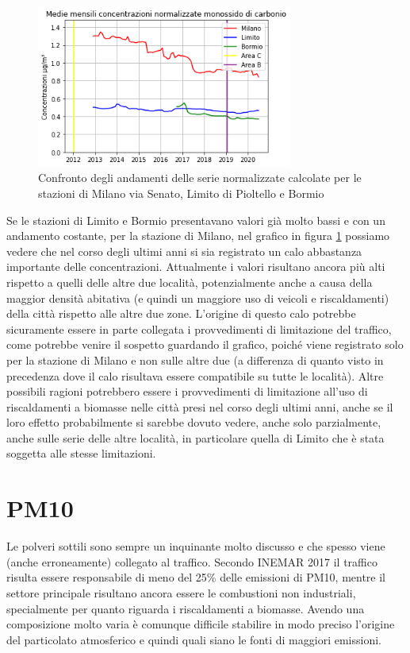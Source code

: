 \documentclass[a4paper]{report}
\begin{document}
\begin{figure}[h]
\centering
\includegraphics[width=0.75\textwidth]{co_traffico}
\caption{Confronto degli andamenti delle serie normalizzate calcolate per le stazioni di Milano via Senato, Limito di Pioltello e Bormio}
\label{fig:co_traffico}
\end{figure}

Se le stazioni di Limito e Bormio presentavano valori già molto bassi e con un andamento costante, per la stazione di Milano, nel grafico in figura \ref{fig:co_traffico} possiamo vedere che nel corso degli ultimi anni si sia registrato un calo abbastanza importante delle concentrazioni. Attualmente i valori risultano ancora più alti rispetto a quelli delle altre due località, potenzialmente anche a causa della maggior densità abitativa (e quindi un maggiore uso di veicoli e riscaldamenti) della città rispetto alle altre due zone.
L'origine di questo calo potrebbe sicuramente essere in parte collegata i provvedimenti di limitazione del traffico, come potrebbe venire il sospetto guardando il grafico, poiché viene registrato solo per la stazione di Milano e non sulle altre due (a differenza di quanto visto in precedenza dove il calo risultava essere compatibile su tutte le località). Altre possibili ragioni potrebbero essere i provvedimenti di limitazione all'uso di riscaldamenti a biomasse nelle città presi nel corso degli ultimi anni, anche se il loro effetto probabilmente si sarebbe dovuto vedere, anche solo parzialmente, anche sulle serie delle altre località, in particolare quella di Limito che è stata soggetta alle stesse limitazioni.

\section{PM10}
Le polveri sottili sono sempre un inquinante molto discusso e che spesso viene (anche erroneamente) collegato al traffico. Secondo INEMAR 2017 \cite{inemar2017} il traffico risulta essere responsabile di meno del 25\% delle emissioni di PM10, mentre il settore principale risultano ancora essere le combustioni non industriali, specialmente per quanto riguarda i riscaldamenti a biomasse. Avendo una composizione molto varia è comunque difficile stabilire in modo preciso l'origine del particolato atmosferico e quindi quali siano le fonti di maggiori emissioni.
\end{document}
